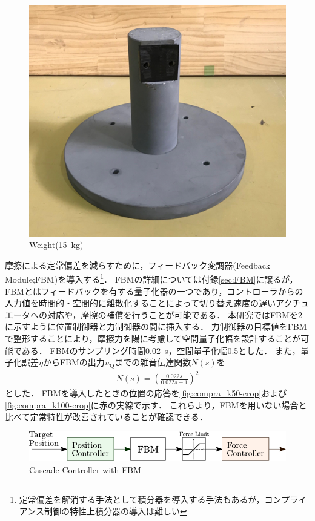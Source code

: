 \begin{figure}[t]
    \centering
        \includegraphics[keepaspectratio, width = .6\linewidth]{contents/IntegrationControl/figure/weigth.png}
        \caption{Weight(\SI{15}{kg})}
        \label{fig:omori}
\end{figure}

摩擦による定常偏差を減らすために，フィードバック変調器(Feedback Module;FBM)を導入する\footnote{定常偏差を解消する手法として積分器を導入する手法もあるが，コンプライアンス制御の特性上積分器の導入は難しい}\cite{石川将人2007,石川将人2008フィードバック変調器を用いた離散値入力制御におけるアクチュエータ非線形性の補償}．
FBMの詳細については付録\ref{sec:FBM}に譲るが，FBMとはフィードバックを有する量子化器の一つであり，コントローラからの入力値を時間的・空間的に離散化することによって切り替え速度の遅いアクチュエータへの対応や，摩擦の補償を行うことが可能である\cite{石川将人2008フィードバック変調器を用いた離散値入力制御におけるアクチュエータ非線形性の補償,佐藤順紀2013不等間隔量子化入力とアクチュエータの非線形要素モデルを用いたフィードバック変調器による油圧駆動システムの軌道制御,Ohgi_2008jrm}．
本研究ではFBMを\figname\ref{fig:casquade_torqueandposition_FBM}に示すように位置制御器と力制御器の間に挿入する．
力制御器の目標値をFBMで整形することにより，摩擦力を陽に考慮して空間量子化幅を設計することが可能である．
FBMのサンプリング時間\SI{0.02}{s}，空間量子化幅0.5とした．
また，量子化誤差$\eta$からFBMの出力$u_\mathrm{Q}$までの雑音伝達関数$N(s)$を
\begin{align}
    \label{eq:Ns}
    N(s) = \left( \frac{0.022s}{0.022s+1} \right)^2
\end{align}
とした．
FBMを導入したときの位置の応答を\figname\ref{fig:compra_k50-crop}および\figname\ref{fig:compra_k100-crop}に赤の実線で示す．
これらより，FBMを用いない場合と比べて定常特性が改善されていることが確認できる．
\begin{figure}[t]
    \centering
        \includegraphics[keepaspectratio, scale=1.0]{contents/IntegrationControl/figure/casquade_torqueandposition_FBM.pdf}
        \caption{Cascade Controller with FBM}
        \label{fig:casquade_torqueandposition_FBM}
\end{figure}

